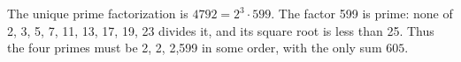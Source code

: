The unique prime factorization is $4792=2^3\cdot599$. The factor 599 is prime: none of 2, 3, 5, 7, 11, 13, 17, 19, 23 divides it, and its square root is less than 25. Thus the four primes must be 2, 2, 2,599 in some order, with the only sum $\boxed{605}$.
